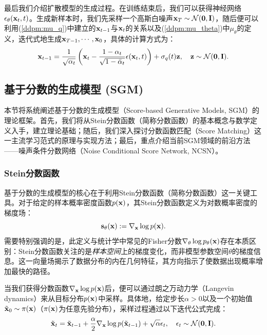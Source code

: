\documentclass[11pt,a4paper,UTF8]{ctexart}
\begin{document}
最后我们介绍扩散模型的生成过程。在训练结束后，我们可以获得神经网络$\epsilon_{\theta}(\mathbf{x}_t,t)$。生成新样本时，我们先采样一个高斯白噪声$\mathbf{x}_T\sim\mathcal{N}(\mathbf{0},\mathbf{I})$，随后便可以利用(\ref{ddpm:mu_q})中建立的$\mathbf{x}_{t-1}$与$\mathbf{x}_t$的关系以及(\ref{ddpm:mu_theta})中$\mu_\theta$的定义，迭代式地生成$\mathbf{x}_{T-1},\cdots,\mathbf{x}_0$，具体的计算方式为：
\begin{equation*}
    \mathbf{x}_{t-1} = \frac{1}{\sqrt{\alpha_t}}\left(\mathbf{x}_t -\frac{1-\alpha_t}{\sqrt{1-\bar{\alpha}_t}} \epsilon(\mathbf{x}_t,t) \right) + \sigma_q(t)\mathbf{z},\quad \mathbf{z}\sim\mathcal{N}(\mathbf{0},\mathbf{I}).
\end{equation*}

\subsection{基于分数的生成模型 (SGM)}

本节将系统阐述基于分数的生成模型（Score-based Generative Models, SGM）的理论框架。首先，我们将从Stein分数函数（简称分数函数）的基本概念与数学定义入手，建立理论基础；随后，我们深入探讨分数函数匹配（Score Matching）这一主流学习范式的原理与实现方法；最后，重点介绍当前SGM领域的前沿方法——噪声条件分数网络（Noise Conditional Score Network, NCSN）\cite{song2020score}。

\subsubsection{Stein分数函数}

基于分数的生成模型的核心在于利用Stein分数函数（简称分数函数）\cite{Hyvrinen2005EstimationON}这一关键工具。对于给定的样本概率密度函数$p(\mathbf{x})$，其Stein分数函数定义为对数概率密度的梯度场：
\begin{equation*}
    \mathbf{s}_\theta(\mathbf{x}) := \nabla_{\mathbf{x}}\log p(\mathbf{x}).
\end{equation*}
需要特别强调的是，此定义与统计学中常见的Fisher分数$\nabla_\theta \log p_{\theta}(\mathbf{x})$存在本质区别：Stein分数函数关注的是\emph{样本空间}上的梯度变化，而非模型参数空间$\theta$的梯度信息。这一向量场揭示了数据分布的内在几何特征，其方向指示了使数据出现概率增加最快的路径。

当我们获得分数函数$\nabla_{\mathbf{x}}\log p(\mathbf{x})$后，便可以通过朗之万动力学（Langevin dynamics）来从目标分布$p(\mathbf{x})$中采样。具体地，给定步长$\alpha>0$以及一个初始值$\tilde{\mathbf{x}}_0\sim\pi(\mathbf{x})$（$\pi(\mathbf{x})$为任意先验分布），采样过程通过以下迭代公式完成：
\begin{equation*}
    \tilde{\mathbf{x}}_t = \tilde{\mathbf{x}}_{t-1} + \frac{\alpha}{2} \nabla_{\mathbf{x}}\log p(\tilde{\mathbf{x}}_{t-1}) + \sqrt{\alpha}\epsilon_t,\quad \epsilon_t\sim\mathcal{N}(\mathbf{0},\mathbf{I}).
\end{equation*}
\end{document}
